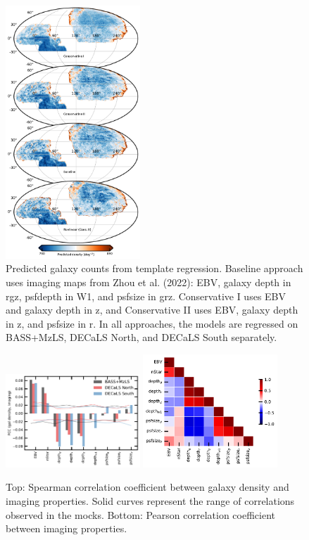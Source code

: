 \begin{figure}
    \centering
    \includegraphics[width=0.45\textwidth]{figures/npred.pdf}
    \caption{Predicted galaxy counts from template regression. Baseline approach uses imaging maps from Zhou et al. (2022): EBV, galaxy depth in rgz, psfdepth in W1, and psfsize in grz. Conservative I uses EBV and galaxy depth in z, and Conservative II uses EBV, galaxy depth in z, and psfsize in r. In all approaches, the models are regressed on BASS+MzLS, DECaLS North, and DECaLS South separately.}
    \label{fig:npred}
\end{figure}



\begin{figure}
    \includegraphics[width=0.45\textwidth]{figures/pcc.pdf} 
    \includegraphics[width=0.45\textwidth]{figures/pccx.pdf}     
    \caption{Top: Spearman correlation coefficient between galaxy density and imaging properties. Solid curves represent the range of correlations observed in the mocks. Bottom: Pearson correlation coefficient between imaging properties.}
    \label{fig:pcc}
\end{figure}






